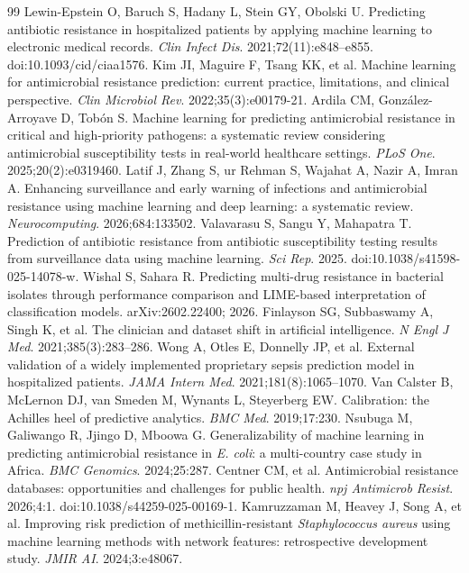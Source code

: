 \documentclass[11pt,a4paper]{article}
\begin{document}
\begin{thebibliography}{99}
 Lewin-Epstein O, Baruch S, Hadany L, Stein GY, Obolski U. Predicting antibiotic resistance in hospitalized patients by applying machine learning to electronic medical records. \textit{Clin Infect Dis}. 2021;72(11):e848--e855. doi:10.1093/cid/ciaa1576.
 Kim JI, Maguire F, Tsang KK, et al. Machine learning for antimicrobial resistance prediction: current practice, limitations, and clinical perspective. \textit{Clin Microbiol Rev}. 2022;35(3):e00179-21.
 Ardila CM, Gonz\'alez-Arroyave D, Tob\'on S. Machine learning for predicting antimicrobial resistance in critical and high-priority pathogens: a systematic review considering antimicrobial susceptibility tests in real-world healthcare settings. \textit{PLoS One}. 2025;20(2):e0319460.
 Latif J, Zhang S, ur Rehman S, Wajahat A, Nazir A, Imran A. Enhancing surveillance and early warning of infections and antimicrobial resistance using machine learning and deep learning: a systematic review. \textit{Neurocomputing}. 2026;684:133502.
 Valavarasu S, Sangu Y, Mahapatra T. Prediction of antibiotic resistance from antibiotic susceptibility testing results from surveillance data using machine learning. \textit{Sci Rep}. 2025. doi:10.1038/s41598-025-14078-w.
 Wishal S, Sahara R. Predicting multi-drug resistance in bacterial isolates through performance comparison and LIME-based interpretation of classification models. arXiv:2602.22400; 2026.
 Finlayson SG, Subbaswamy A, Singh K, et al. The clinician and dataset shift in artificial intelligence. \textit{N Engl J Med}. 2021;385(3):283--286.
 Wong A, Otles E, Donnelly JP, et al. External validation of a widely implemented proprietary sepsis prediction model in hospitalized patients. \textit{JAMA Intern Med}. 2021;181(8):1065--1070.
 Van Calster B, McLernon DJ, van Smeden M, Wynants L, Steyerberg EW. Calibration: the Achilles heel of predictive analytics. \textit{BMC Med}. 2019;17:230.
 Nsubuga M, Galiwango R, Jjingo D, Mboowa G. Generalizability of machine learning in predicting antimicrobial resistance in \textit{E. coli}: a multi-country case study in Africa. \textit{BMC Genomics}. 2024;25:287.
 Centner CM, et al. Antimicrobial resistance databases: opportunities and challenges for public health. \textit{npj Antimicrob Resist}. 2026;4:1. doi:10.1038/s44259-025-00169-1.
 Kamruzzaman M, Heavey J, Song A, et al. Improving risk prediction of methicillin-resistant \textit{Staphylococcus aureus} using machine learning methods with network features: retrospective development study. \textit{JMIR AI}. 2024;3:e48067.

\end{thebibliography}
\end{document}
